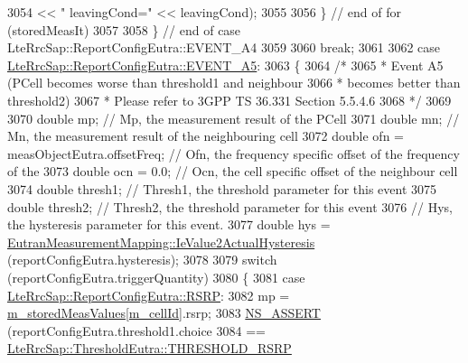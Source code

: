 \begin{DoxyCode}
3054                                << \textcolor{stringliteral}{" leavingCond="} << leavingCond);
3055 
3056           \} \textcolor{comment}{// end of for (storedMeasIt)}
3057 
3058       \} \textcolor{comment}{// end of case LteRrcSap::ReportConfigEutra::EVENT\_A4}
3059 
3060       \textcolor{keywordflow}{break};
3061 
3062     \textcolor{keywordflow}{case} \hyperlink{structns3_1_1LteRrcSap_1_1ReportConfigEutra_ab8152dc095987f60bee2e9115046902fae92d8c286b3b1a6e39edc844df72588c}{LteRrcSap::ReportConfigEutra::EVENT\_A5}:
3063       \{
3064         \textcolor{comment}{/*}
3065 \textcolor{comment}{         * Event A5 (PCell becomes worse than threshold1 and neighbour}
3066 \textcolor{comment}{         * becomes better than threshold2)}
3067 \textcolor{comment}{         * Please refer to 3GPP TS 36.331 Section 5.5.4.6}
3068 \textcolor{comment}{         */}
3069 
3070         \textcolor{keywordtype}{double} mp; \textcolor{comment}{// Mp, the measurement result of the PCell}
3071         \textcolor{keywordtype}{double} mn; \textcolor{comment}{// Mn, the measurement result of the neighbouring cell}
3072         \textcolor{keywordtype}{double} ofn = measObjectEutra.offsetFreq; \textcolor{comment}{// Ofn, the frequency specific offset of the frequency of
       the}
3073         \textcolor{keywordtype}{double} ocn = 0.0; \textcolor{comment}{// Ocn, the cell specific offset of the neighbour cell}
3074         \textcolor{keywordtype}{double} thresh1; \textcolor{comment}{// Thresh1, the threshold parameter for this event}
3075         \textcolor{keywordtype}{double} thresh2; \textcolor{comment}{// Thresh2, the threshold parameter for this event}
3076         \textcolor{comment}{// Hys, the hysteresis parameter for this event.}
3077         \textcolor{keywordtype}{double} hys = \hyperlink{classns3_1_1EutranMeasurementMapping_ac0c6d0adbba21c8531600fed399f9f21}{EutranMeasurementMapping::IeValue2ActualHysteresis}
       (reportConfigEutra.hysteresis);
3078 
3079         \textcolor{keywordflow}{switch} (reportConfigEutra.triggerQuantity)
3080           \{
3081           \textcolor{keywordflow}{case} \hyperlink{structns3_1_1LteRrcSap_1_1ReportConfigEutra_a82343ddf526faba0483431ea5882a3efa5b7591e86ab7bcefc7fe1528762114d7}{LteRrcSap::ReportConfigEutra::RSRP}:
3082             mp = \hyperlink{classns3_1_1LteUeRrc_a93094dcd5c235b2e2a8a299125100a57}{m\_storedMeasValues}[\hyperlink{classns3_1_1LteUeRrc_aa9d3317734eea9158371d9fccf3a0c48}{m\_cellId}].rsrp;
3083             \hyperlink{assert_8h_a6dccdb0de9b252f60088ce281c49d052}{NS\_ASSERT} (reportConfigEutra.threshold1.choice
3084                        == \hyperlink{structns3_1_1LteRrcSap_1_1ThresholdEutra_ad3ed2704b836132980dd2e97cb03822ca0663d5baa9382bd755acb712f6ebf707}{LteRrcSap::ThresholdEutra::THRESHOLD\_RSRP}

\end{DoxyCode}
